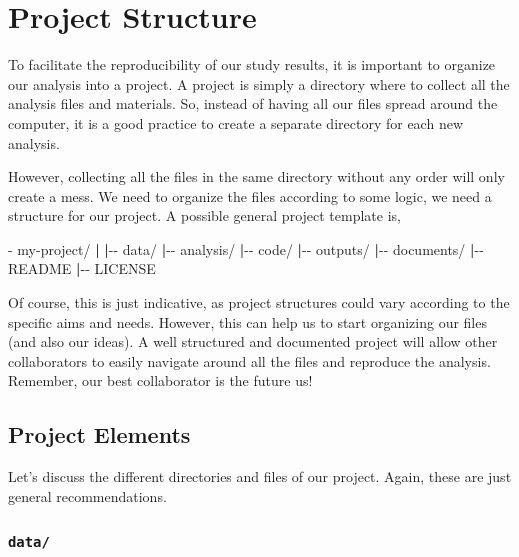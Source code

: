 \documentclass[
  11pt,
]{book}
\newenvironment{Shaded}{\begin{snugshade}}{\end{snugshade}}
\newcommand{\ExtensionTok}[1]{#1}
\newcommand{\KeywordTok}[1]{\textcolor[rgb]{0.13,0.29,0.53}{\textbf{#1}}}
\newcommand{\NormalTok}[1]{#1}
\begin{document}
\hypertarget{project-structure}{%
\section{Project Structure}\label{project-structure}}

To facilitate the reproducibility of our study results, it is important to organize our analysis into a project. A project is simply a directory where to collect all the analysis files and materials. So, instead of having all our files spread around the computer, it is a good practice to create a separate directory for each new analysis.

However, collecting all the files in the same directory without any order will only create a mess. We need to organize the files according to some logic, we need a structure for our project. A possible general project template is,

\begin{Shaded}
\begin{Highlighting}[]
\ExtensionTok{{-}}\NormalTok{ my{-}project/}
    \KeywordTok{|}
    \KeywordTok{|}\ExtensionTok{{-}{-}}\NormalTok{ data/}
    \KeywordTok{|}\ExtensionTok{{-}{-}}\NormalTok{ analysis/}
    \KeywordTok{|}\ExtensionTok{{-}{-}}\NormalTok{ code/}
    \KeywordTok{|}\ExtensionTok{{-}{-}}\NormalTok{ outputs/}
    \KeywordTok{|}\ExtensionTok{{-}{-}}\NormalTok{ documents/}
    \KeywordTok{|}\ExtensionTok{{-}{-}}\NormalTok{ README}
    \KeywordTok{|}\ExtensionTok{{-}{-}}\NormalTok{ LICENSE}
\end{Highlighting}
\end{Shaded}

Of course, this is just indicative, as project structures could vary according to the specific aims and needs. However, this can help us to start organizing our files (and also our ideas). A well structured and documented project will allow other collaborators to easily navigate around all the files and reproduce the analysis. Remember, our best collaborator is the future us!

\hypertarget{project-elements}{%
\subsection{Project Elements}\label{project-elements}}

Let's discuss the different directories and files of our project. Again, these are just general recommendations.

\hypertarget{data}{%
\subsubsection{\texorpdfstring{\texttt{data/}}{data/}}\label{data}}
\end{document}
